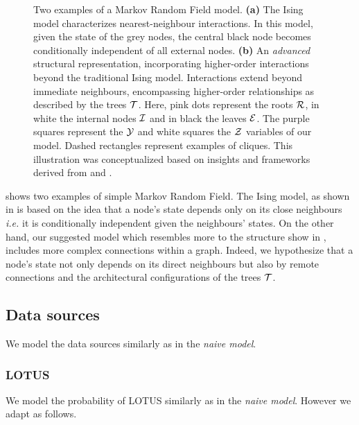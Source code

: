 \documentclass[
11pt, %
oneside, %
english, %
singlespacing, %
headsepline, %
chapterinoneline, %
]{MastersDoctoralThesis} %
\def\E{\mathbb{E}}
\def\E{{\cal E}}
\def\I{{\cal I}}
\def\R{{\cal R}}
\def\T{{\cal T}}
\def\X{{\cal X}}
\def\Y{{\cal Y}}
\def\Z{{\cal Z}}
\begin{document}
\begin{figure}[h]
	\caption{Two examples of a Markov Random Field model. \textbf{(a)} The Ising model \cite{isingBeitragZurTheorie1925} characterizes nearest-neighbour interactions. In this model, given the state of the grey nodes, the central black node becomes conditionally independent of all external nodes. \textbf{(b)} An \textit{advanced} structural representation, incorporating higher-order interactions beyond the traditional Ising model. Interactions extend beyond immediate neighbours, encompassing higher-order relationships as described by the trees $\T$. Here, pink dots represent the roots $\R$, in white the internal nodes $\I$ and in black the leaves $\E$. The purple squares represent the $\Y$ and white squares the $\Z$ variables of our model. Dashed rectangles represent examples of cliques. This illustration was conceptualized based on insights and frameworks derived from \cite{MarkovRandomField} and \cite{acarMarkovRandomField2016}. }
	\label{fig:MRF}
\end{figure}

 shows two examples of simple Markov Random Field. The Ising model, as shown in  is based on the idea that a node's state depends only on its close neighbours \textit{i.e.} it is conditionally independent given the neighbours' states. On the other hand, our suggested model which resembles more to the structure show in , includes more complex connections within a graph. Indeed, we hypothesize that a node's state not only depends on its direct neighbours but also by remote connections and the architectural configurations of the trees $\T$.

\subsection{Data sources}\label{subsec:data source RMF}
We model the data sources similarly as in the \textit{naive model}. 


\subsubsection{LOTUS}
We model the probability of LOTUS similarly as in the \textit{naive model}. However we adapt  as follows. 
\end{document}
